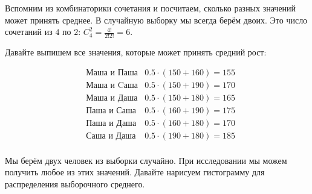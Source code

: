 \documentclass[12pt, a4paper, oneside]{article}
\begin{document}
\begin{sol}
Вспомним из комбинаторики сочетания и посчитаем, сколько разных значений может принять среднее. В случайную выборку мы всегда берём двоих. Это число сочетаний из $4$ по $2$:  $C_4^2 = \frac{4!}{2!2!} =  6$.

Давайте выпишем все значения, которые может принять средний рост: 

\begin{equation*}
\begin{aligned}
& \text{Маша и Паша}  & 0.5 \cdot (150 + 160) = 155 \\
& \text{Маша и Cаша}  & 0.5 \cdot (150 + 190) = 170 \\
& \text{Маша и Даша}  & 0.5 \cdot (150 + 180) = 165 \\
& \text{Паша и Саша}  & 0.5 \cdot (160 + 190) = 175 \\
& \text{Паша и Даша}  & 0.5 \cdot (160 + 180) =  170 \\
& \text{Саша и Даша}  & 0.5 \cdot (190 + 180) =  185 \\
\end{aligned} 
\end{equation*}

Мы берём двух человек из выборки случайно. При исследовании мы можем получить любое из этих значений.  Давайте нарисуем гистограмму для  распределения выборочного среднего. 


\end{sol}
\end{document}
